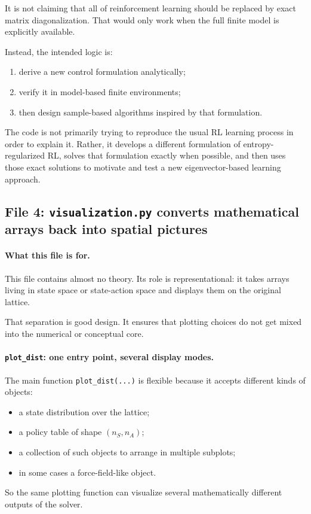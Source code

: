 \documentclass[11pt]{article}
\begin{document}
It is not claiming that all of reinforcement learning should be replaced by exact matrix
diagonalization. That would only work when the full finite model is explicitly available.

Instead, the intended logic is:
\begin{enumerate}
    \item derive a new control formulation analytically;
    \item verify it in model-based finite environments;
    \item then design sample-based algorithms inspired by that formulation.
\end{enumerate}

The code is not primarily trying to reproduce the usual RL learning process in order to
explain it. Rather, it develops a different formulation of entropy-regularized RL, solves that
formulation exactly when possible, and then uses those exact solutions to motivate and test a
new eigenvector-based learning approach.

\subsection*{File 4: \texttt{visualization.py} converts mathematical arrays back into spatial pictures}

\paragraph{What this file is for.}
This file contains almost no theory. Its role is representational: it takes arrays living in
state space or state-action space and displays them on the original lattice.

That separation is good design. It ensures that plotting choices do not get mixed into the
numerical or conceptual core.

\paragraph{\texttt{plot\_dist}: one entry point, several display modes.}
The main function \texttt{plot\_dist(...)} is flexible because it accepts different kinds of
objects:
\begin{itemize}
    \item a state distribution over the lattice;
    \item a policy table of shape \((n_S,n_A)\);
    \item a collection of such objects to arrange in multiple subplots;
    \item in some cases a force-field-like object.
\end{itemize}
So the same plotting function can visualize several mathematically different outputs of the
solver.
\end{document}
